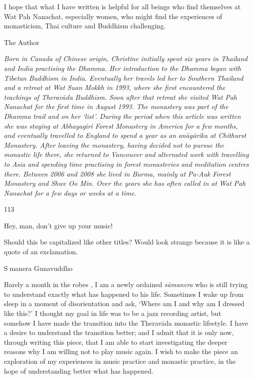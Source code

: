 I hope that what I have written is helpful for all beings who find
themselves at Wat Pah Nanachat, especially women, who might find the
experiences of monasticism, Thai culture and Buddhism challenging.

The Author

\emph{Born in Canada of Chinese origin, Christine initially spent six
years in Thailand and India practising the Dhamma. Her introduction to
the Dhamma began with Tibetan Buddhism in India. Eventually her travels
led her to Southern Thailand and a retreat at Wat Suan Mokkh in 1993,
where she first encountered the teachings of Theravāda Buddhism. Soon
after that retreat she visited Wat Pah Nanachat for the first time in
August 1993. The monastery was part of the Dhamma trail and on her
`list'. During the period when this article was written she was staying
at Abhayagiri Forest Monastery in America for a few months, and
eventually travelled to England to spend a year as an anāgārika at
Chithurst Monastery. After leaving the monastery, having decided not to
pursue the monastic life there, she returned to Vancouver and alternated
work with travelling to Asia and spending time practising in forest
monasteries and meditation centres there. Between 2006 and 2008 she
lived in Burma, mainly at Pa-Auk Forest Monastery and Shwe Oo Min. Over
the years she has often called in at Wat Pah Nanachat for a few days or
weeks at a time.}

113

Hey, man, don't give up your music!

Should this be capitalized like other titles? Would look strange because
it is like a quote of an exclamation.

Smanera Gunavuddho

Barely a month in the robes , I am a newly ordained \emph{sāmanera} who
is still trying to understand exactly what has happened to his life.
Sometimes I wake up from sleep in a moment of disorientation and ask,
`Where am I and why am I dressed like this?' I thought my goal in life
was to be a jazz recording artist, but somehow I have made the
transition into the Theravāda‎ monastic lifestyle. I have a desire to
understand the transition better; and I admit that it is only now,
through writing this piece, that I am able to start investigating the
deeper reasons why I am willing not to play music again. I wish to make
the piece an exploration of my experiences in music practice and
monastic practice, in the hope of understanding better what has
happened.

